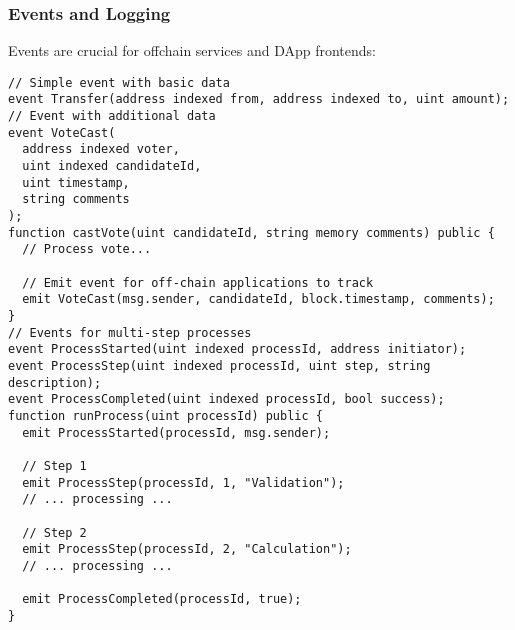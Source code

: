 \documentclass[12pt]{article}
\begin{document}
\subsubsection*{Events and Logging}
Events are crucial for offchain services and DApp frontends:

\noindent
\begin{minipage}[c]{\textwidth}
\begin{lstlisting}[language=Solidity]
// Simple event with basic data
event Transfer(address indexed from, address indexed to, uint amount);
// Event with additional data
event VoteCast(
  address indexed voter,
  uint indexed candidateId,
  uint timestamp,
  string comments
);
function castVote(uint candidateId, string memory comments) public {
  // Process vote...
  
  // Emit event for off-chain applications to track
  emit VoteCast(msg.sender, candidateId, block.timestamp, comments);
}
// Events for multi-step processes
event ProcessStarted(uint indexed processId, address initiator);
event ProcessStep(uint indexed processId, uint step, string description);
event ProcessCompleted(uint indexed processId, bool success);
function runProcess(uint processId) public {
  emit ProcessStarted(processId, msg.sender);
  
  // Step 1
  emit ProcessStep(processId, 1, "Validation");
  // ... processing ...

  // Step 2
  emit ProcessStep(processId, 2, "Calculation");
  // ... processing ...

  emit ProcessCompleted(processId, true);
}
\end{lstlisting}
\end{minipage}
\end{document}
